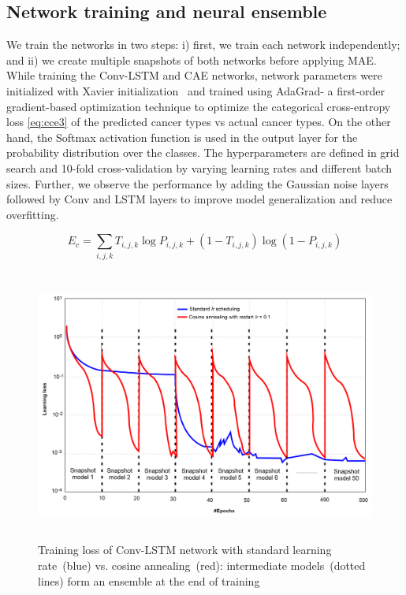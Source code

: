 \subsection{Network training and neural ensemble} %
We train the networks in two steps: i) first, we train each network independently; and ii) we create multiple snapshots of both networks before applying MAE. While training the Conv-LSTM and CAE networks, network parameters were initialized with Xavier initialization~\cite{xavier} and trained using AdaGrad- a first-order gradient-based optimization technique to optimize the categorical cross-entropy loss \cref{eq:cce3} of the predicted cancer types vs actual cancer types. On the other hand, the Softmax activation function is used in the output layer for the probability distribution over the classes. The hyperparameters are defined in grid search and 10-fold cross-validation by varying learning rates and different batch sizes. Further, we observe the performance by adding the Gaussian noise layers followed by Conv and LSTM layers to improve model generalization and reduce overfitting. 

\vspace{-2mm}
\begin{equation} 
    E_{c} = \sum_{i, j, k} T_{i, j, k} \log P_{i, j, k}+\left(1-T_{i, j, k}\right) \log \left(1-P_{i, j, k}\right)
    \label{eq:cce3}
\end{equation} 

\begin{figure}
    \centering
    \includegraphics[width=\textwidth,height=90mm]{images/ca.png}
    \caption{Training loss of Conv-LSTM network with standard learning rate~(blue) vs. cosine annealing~(red): intermediate models~(dotted lines) form an ensemble at the end of training~\cite{karimACCA2019}}
    \label{fig:ca}
    \vspace{-2mm}
\end{figure}

